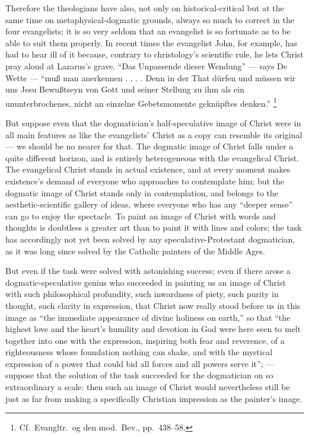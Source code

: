 \documentclass[12pt,a4paper]{book}
\begin{document}
Therefore the theologians have also, not only on historical-critical but at the same time on
metaphysical-dogmatic grounds, always so much to correct in the four evangelists; it is so very
seldom that an evangelist is so fortunate as to be able to suit them properly. In recent times
the evangelist John, for example, has had to hear ill of it because, contrary to christology's
scientific rule, he lets Christ pray aloud at Lazarus's grave. ``Das Unpassende dieser Wendung''
--- says De Wette --- ``muß man anerkennen . . . . Denn in der That dürfen und müssen wir uns
Jesu Bewußtseyn von Gott und seiner Stellung zu ihm als ein ununterbrochenes, nicht an einzelne
Gebetsmomente geknüpftes denken.''%
\footnote{Cf.\ Evangltr.\ og den mod.\ Bev., pp.\ 438--58.}

But suppose even that the dogmatician's half-speculative image of Christ were in all main
features as like the evangelists' Christ as a copy can resemble its original --- we should be
no nearer for that. The dogmatic image of Christ falls under a quite different horizon, and is
entirely heterogeneous with the evangelical Christ. The evangelical Christ stands in actual
existence, and at every moment makes existence's demand of everyone who approaches to
contemplate him; but the dogmatic image of Christ stands only in contemplation,
and belongs to the aesthetic-scientific gallery of ideas, where everyone who has any ``deeper
sense'' can go to enjoy the spectacle. To paint an image of Christ with words and thoughts is
doubtless a greater art than to paint it with lines and colors; the task has accordingly not yet
been solved by any speculative-Protestant dogmatician, as it was long since solved by the
Catholic painters of the Middle Ages.

But even if the task were solved with astonishing success; even if there arose a
dogmatic-speculative genius who succeeded in painting us an image of Christ with such
philosophical profundity, such inwardness of piety, such purity in thought, such clarity in
expression, that Christ now really stood before us in this image as ``the immediate appearance
of divine holiness on earth,'' so that ``the highest love and the heart's humility and devotion
in God were here seen to melt together into one with the expression, inspiring both fear and
reverence, of a righteousness whose foundation nothing can shake, and with the mystical
expression of a power that could bid all forces and all powers serve it''; --- suppose that the
solution of the task succeeded for the dogmatician on so extraordinary a scale: then such an
image of Christ would nevertheless still be just as far from making a specifically Christian
impression as the painter's image.
\end{document}
